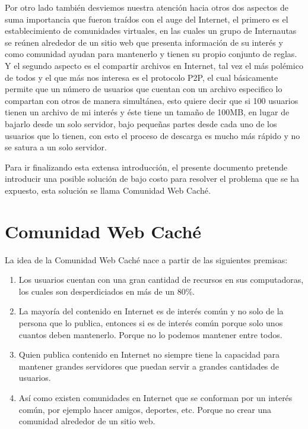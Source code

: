 Por otro lado también desviemos nuestra atención hacia otros dos aspectos de suma importancia que fueron traídos con el auge del Internet, el primero es el establecimiento de comunidades virtuales, en las cuales un grupo de Internautas se reúnen alrededor de un sitio web que presenta información de su interés y como comunidad ayudan para mantenerlo y tienen su propio conjunto de reglas. Y el segundo aspecto es el compartir archivos en Internet, tal vez el más polémico de todos y el que más nos interesa es el protocolo P2P, el cual básicamente permite que un número de usuarios que cuentan con un archivo especifico lo compartan con otros de manera simultánea, esto quiere decir que si 100 usuarios tienen un archivo de mi interés y éste tiene un tamaño de 100MB, en lugar de bajarlo desde un solo servidor, bajo pequeñas partes desde cada uno de los usuarios que lo tienen, con esto el proceso de descarga es mucho más rápido y no se satura a un solo servidor.

Para ir finalizando esta extensa introducción, el presente documento pretende introducir una posible solución de bajo costo para resolver el problema que se ha expuesto, esta solución se llama Comunidad Web Caché.


\section{Comunidad Web Caché}

La idea de la Comunidad Web Caché nace a partir de las siguientes premisas:

\begin{enumerate}
\item Los usuarios cuentan con una gran cantidad de recursos en sus computadoras, los cuales son desperdiciados en más de un 80\%.
\item La mayoría del contenido en Internet es de interés común y no solo de la persona que lo publica, entonces si es de interés común porque solo unos cuantos deben mantenerlo. Porque no lo podemos mantener entre todos.
\item Quien publica contenido en Internet no siempre tiene la capacidad para mantener grandes servidores que puedan  servir a grandes cantidades de usuarios.
\item Así como existen comunidades en Internet que se conforman por un interés común, por ejemplo hacer amigos, deportes, etc. Porque no crear una comunidad alrededor de un sitio web.
\marginpar{\myTitle \myVersion}
\end{enumerate}

